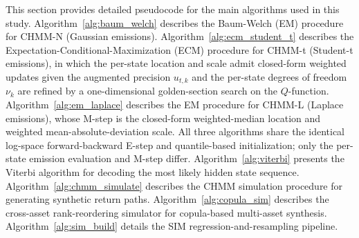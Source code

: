 This section provides detailed pseudocode for the main algorithms used in this study.
Algorithm~\ref{alg:baum_welch} describes the Baum-Welch (EM) procedure for CHMM-N (Gaussian emissions).
Algorithm~\ref{alg:ecm_student_t} describes the Expectation-Conditional-Maximization (ECM) procedure for CHMM-t (Student-t emissions), in which the per-state location and scale admit closed-form weighted updates given the augmented precision $u_{t,k}$ and the per-state degrees of freedom $\nu_k$ are refined by a one-dimensional golden-section search on the $Q$-function.
Algorithm~\ref{alg:em_laplace} describes the EM procedure for CHMM-L (Laplace emissions), whose M-step is the closed-form weighted-median location and weighted mean-absolute-deviation scale.
All three algorithms share the identical log-space forward-backward E-step and quantile-based initialization; only the per-state emission evaluation and M-step differ.
Algorithm~\ref{alg:viterbi} presents the Viterbi algorithm for decoding the most likely hidden state sequence.
Algorithm~\ref{alg:chmm_simulate} describes the CHMM simulation procedure for generating synthetic return paths.
Algorithm~\ref{alg:copula_sim} describes the cross-asset rank-reordering simulator for copula-based multi-asset synthesis.
Algorithm~\ref{alg:sim_build} details the SIM regression-and-resampling pipeline.

